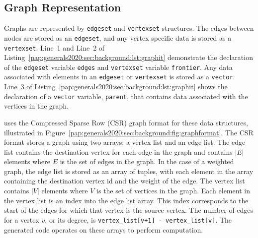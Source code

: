 \subsection{Graph Representation}
Graphs are represented by \lstinline[language=graphit]{edgeset} and \lstinline[language=graphit]{vertexset} structures.
The edges between nodes are stored as an \lstinline[language=graphit]{edgeset}, and any vertex specific data is stored as a \lstinline[language=graphit]{vertexset}.
Line~1 and Line~2 of Listing~\ref{pap:generals2020:sec:background:lst:graphit} demonstrate the declaration of the \lstinline[language=graphit]{edgeset} variable \lstinline[language=graphit]{edges} and  \lstinline[language=graphit]{vertexset} variable \lstinline[language=graphit]{frontier}. 
Any data associated with elements in an \lstinline[language=graphit]{edgeset} or \lstinline[language=graphit]{vertexset} is stored as a \lstinline[language=graphit]{vector}.
Line~3 of Listing~\ref{pap:generals2020:sec:background:lst:graphit} shows the declaration of a \lstinline[language=graphit]{vector} variable, \lstinline[language=graphit]{parent}, that contains data associated with the vertices in the graph.

\graphit uses the Compressed Sparse Row (CSR) graph format for these data structures, illustrated in Figure~\ref{pap:generals2020:sec:background:fig:graphformat}.
The CSR format stores a graph using two arrays: a vertex list and an edge list.
The edge list contains the destination vertex for each edge in the graph and contains $|E|$ elements where $E$ is the set of edges in the graph.
In the case of a weighted graph, the edge list is stored as an array of tuples, with each element in the array containing the destination vertex id and the weight of the edge.
The vertex list contains $|V|$ elements where $V$ is the set of vertices in the graph. 
Each element in the vertex list is an index into the edge list array.
This index corresponds to the start of the edges for which that vertex is the source vertex.
The number of edges for a vertex $v$, or its degree, is \texttt{vertex\_list[v+1] - vertex\_list[v]}.
The generated code operates on these arrays to perform computation.

\graphformatfig


